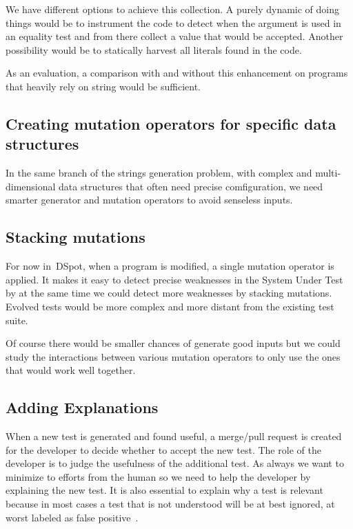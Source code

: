 \documentclass[11pt]{sdm}
\newcommand{\dspot}{DSpot\xspace}
\begin{document}
We have different options to achieve this collection.
A purely dynamic of doing things would be to instrument the code to detect when the argument is used in an equality test and from there collect a value that would be accepted.
Another possibility would be to statically harvest all literals found in the code.

As an evaluation, a comparison with and without this enhancement on programs that heavily rely on string would be sufficient.

\subsection{Creating mutation operators for specific data structures}
\label{create_operators}
In the same branch of the strings generation problem, with complex and multi-dimensional data structures that often need precise comfiguration, we need smarter generator and mutation operators to avoid senseless inputs.

\subsection{Stacking mutations}
\label{stacking}
For now in~\dspot{}, when a program is modified, a single mutation operator is applied.
It makes it easy to detect precise weaknesses in the System Under Test by at the same time we could detect more weaknesses by stacking mutations.
Evolved tests would be more complex and more distant from the existing test suite.

Of course there would be smaller chances of generate good inputs but we could study the interactions between various mutation operators to only use the ones that would work well together.

\subsection{Adding Explanations}
\label{explanation}
When a new test is generated and found useful, a merge/pull request is created for the developer to decide whether to accept the new test.
The role of the developer is to judge the usefulness of the additional test.
As always we want to minimize to efforts from the human so we need to help the developer by explaining the new test.
It is also essential to explain why a test is relevant because in most cases a test that is not understood will be at best ignored, at worst labeled as false positive~\cite{bessey2010few}.
\end{document}
